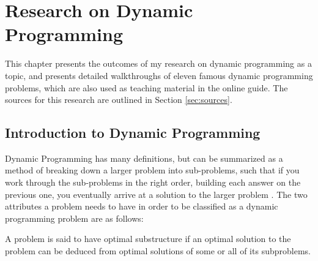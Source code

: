 \chapter{Research on Dynamic Programming}\label{chapter:research}
This chapter presents the outcomes of my research on dynamic programming as a topic, and presents detailed walkthroughs of eleven famous dynamic programming problems, which are also used as teaching material in the online guide.
The sources for this research are outlined in Section \ref{sec:sources}.

\section{Introduction to Dynamic Programming}
Dynamic Programming has many definitions, but can be summarized as a method of breaking down a larger problem into sub-problems, such that if you work through the sub-problems in the right order, building each answer on the previous one, you eventually arrive at a solution to the larger problem \cite{conversableeconomist}.
The two attributes a problem needs to have in order to be classified as a dynamic programming problem are as follows:

\begin{definition}
    A problem is said to have optimal substructure if an optimal solution to the problem can be deduced from optimal solutions of some or all of its subproblems.
\end{definition}

